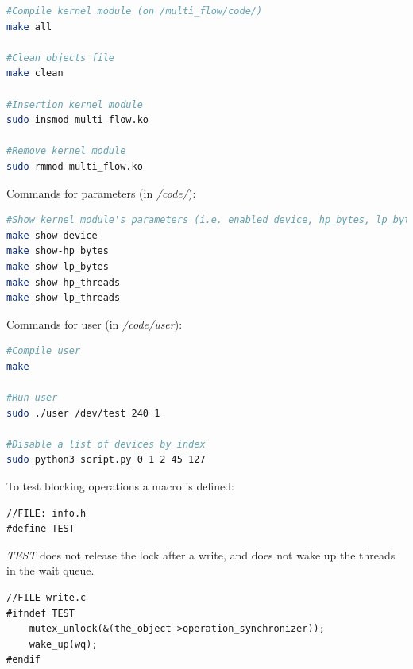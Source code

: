 \documentclass[12pt]{report}
\begin{document}
\begin{lstlisting}[language=Bash]
#Compile kernel module (on /multi_flow/code/)
make all

#Clean objects file
make clean

#Insertion kernel module
sudo insmod multi_flow.ko

#Remove kernel module
sudo rmmod multi_flow.ko
\end{lstlisting}

Commands for parameters (in \emph{/code/}): 

\begin{lstlisting}[language=Bash]
#Show kernel module's parameters (i.e. enabled_device, hp_bytes, lp_bytes, hp_threads, lp_threads)
make show-device
make show-hp_bytes
make show-lp_bytes
make show-hp_threads
make show-lp_threads
\end{lstlisting}

Commands for user (in \emph{/code/user}): 

\begin{lstlisting}[language=Bash]
#Compile user
make

#Run user 
sudo ./user /dev/test 240 1

#Disable a list of devices by index
sudo python3 script.py 0 1 2 45 127
\end{lstlisting}

To test blocking operations a macro is defined: 

\begin{lstlisting}
//FILE: info.h
#define TEST
\end{lstlisting}

\emph{TEST} does not release the lock after a write, and does not wake up the  threads in the wait queue. 

\begin{lstlisting}
//FILE write.c
#ifndef TEST   
	mutex_unlock(&(the_object->operation_synchronizer));
	wake_up(wq);
#endif
\end{lstlisting}
\end{document}
